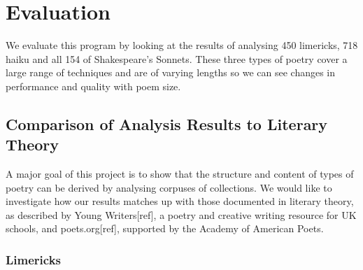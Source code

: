 \chapter{Evaluation}
\ifpdf
    \graphicspath{{Evaluation/EvaluationFigs/PNG/}{Evaluation/EvaluationFigs/PDF/}{Evaluation/EvaluationFigs/}}
\else
    \graphicspath{{Evaluation/EvaluationFigs/EPS/}{Evaluation/EvaluationFigs/}}
\fi

We evaluate this program by looking at the results of analysing 450 limericks, 718 haiku and all 154 of Shakespeare's Sonnets. These three types of poetry cover a large range of techniques and are of varying lengths so we can see changes in performance and quality with poem size.

\section{Comparison of Analysis Results to Literary Theory}
A major goal of this project is to show that the structure and content of types of poetry can be derived by analysing corpuses of collections. We would like to investigate how our results matches up with those documented in literary theory, as described by Young Writers[ref], a poetry and creative writing resource for UK schools, and poets.org[ref], supported by the Academy of American Poets.

\subsection{Limericks}

